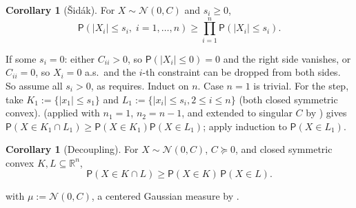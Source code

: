 \documentclass[14pt]{extarticle}
\makeatletter
\theoremstyle{definition}
\newtheorem{corollary}[theorem]{Corollary}
\renewenvironment{proof}[1][\proofname]{\par
  \pushQED{\qed}%
  \normalfont \topsep6\p@\@plus6\p@\relax
  \trivlist
  \item[\hskip\labelsep\bfseries #1\@addpunct{.}]\ignorespaces
}{%
  \popQED\endtrivlist\@endpefalse
}
\newcommand{\R}{\mathbb{R}}
\newcommand{\PP}{\mathsf{P}}
\newcommand{\caln}{\mathcal{N}}
\makeatother
\begin{document}
\begin{corollary}[\v{S}id\'ak]\label{cor:sidak}
  For $X\sim\caln(0,C)$ and $s_i\geqslant 0$,
  \[
    \PP(|X_i|\leqslant s_i,\;i=1,\ldots,n)
    \geqslant\prod_{i=1}^n\PP(|X_i|\leqslant s_i).
  \]
\end{corollary}

\begin{proof}
  If some $s_i=0$: either $C_{ii}>0$, so $\PP(|X_i|\leqslant 0)=0$ and
  the right side vanishes, or $C_{ii}=0$, so $X_i=0$ a.s.\ and the
  $i$-th constraint can be dropped from both sides.  So assume all
  $s_i>0$, as  requires.
  Induct on $n$.  Case $n=1$ is trivial.  For the step, take
  $K_1:=\{|x_1|\leqslant s_1\}$ and
  $L_1:=\{|x_i|\leqslant s_i,2\leqslant i\leqslant n\}$ (both closed symmetric
  convex).   (applied with $n_1=1$, $n_2=n-1$, and
  extended to singular $C$ by ) gives
  $\PP(X\in K_1\cap L_1)\geqslant\PP(X\in K_1)\PP(X\in L_1)$;
  apply induction to $\PP(X\in L_1)$.
\end{proof}

\begin{corollary}[Decoupling]\label{cor:decouple}
  For $X\sim\caln(0,C)$, $C\succcurlyeq 0$, and closed symmetric convex
  $K,L\subseteq\R^n$,
  \[
    \PP(X\in K\cap L)\geqslant\PP(X\in K)\,\PP(X\in L).
  \]
\end{corollary}

\begin{proof}
   with $\mu:=\caln(0,C)$, a centered Gaussian
  measure by .
\end{proof}
\end{document}
